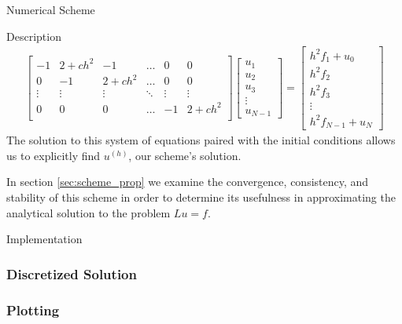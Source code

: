\documentclass{article}
\begin{document}
\begin{section}{Numerical Scheme}
\begin{subsection}{Description}
\begin{align*}
\begin{bmatrix}
        -1 & 2 + ch^2 & -1 & \hdots & 0 & 0\\
        0 & -1 & 2 + ch^2 & \hdots & 0 & 0\\
        \vdots & \vdots & \vdots & \ddots & \vdots & \vdots \\
        0 & 0 & 0 & \hdots & -1 & 2+ch^2 \\
      \end{bmatrix}
      \begin{bmatrix}
        u_1 \\
        u_2 \\
        u_3 \\
        \vdots \\
        u_{N-1}
      \end{bmatrix}
      =
      \begin{bmatrix}
        h^2 f_1 + u_0 \\
        h^2 f_2 \\
        h^2 f_3 \\
        \vdots \\
        h^2 f_{N-1} + u_{N}
      \end{bmatrix}
    \end{align*}
    The solution to this system of equations paired with the initial conditions
    allows us to explicitly find $u^{(h)}$, our scheme's solution.

    In section \ref{sec:scheme_prop} we examine the convergence, consistency,
    and stability of this scheme in order to determine its usefulness in
    approximating the analytical solution to the problem $Lu = f$.
  \end{subsection}

  \begin{subsection}{Implementation}

    \subsubsection{Discretized Solution}

    \subsubsection{Plotting}

  \end{subsection}

\end{section}
\end{document}
